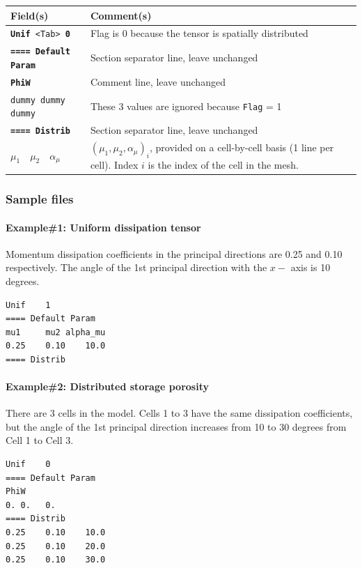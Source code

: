     \begin{tabular}{p{6cm} | p{9cm}}
    \hline
    Field(s) & Comment(s) \\
    \hline  \hline
    \texttt{\textbf{Unif} <Tab> \textbf{0}} & Flag is 0 because the tensor is spatially distributed \\ \hline
    \texttt{\textbf{==== Default Param}} & Section separator line, leave unchanged \\  \hline
    \texttt{\textbf{PhiW}} & Comment line, leave unchanged \\  \hline
    \texttt{dummy  dummy dummy}     & These 3 values are ignored because \texttt{Flag} = 1 \\ \hline
    \texttt{\textbf{==== Distrib}} & Section separator line, leave unchanged \\  \hline
     $\mu_1 \quad \mu_2 \quad \alpha_\mu$      &  $(\mu_1, \mu_2, \alpha_\mu)_i$, provided on a cell-by-cell basis (1 line per cell). Index $i$ is the index of the cell in the mesh.  \\ \hline
    \end{tabular}
%
\subsubsection{Sample files}
%
\paragraph*{Example\#1: Uniform dissipation tensor}
Momentum dissipation coefficients in the principal directions are 0.25 and 0.10 respectively. The angle of the 1st principal direction with the $x-$
axis is 10 degrees.
\begin{verbatim}
Unif	1
==== Default Param
mu1		mu2	alpha_mu
0.25	0.10	10.0
==== Distrib
\end{verbatim}
%
\paragraph*{Example\#2: Distributed storage porosity}
There are 3 cells in the model. Cells 1 to 3 have the same dissipation coefficients, but the angle of the 1st principal direction increases from 10 to 30 degrees from Cell 1 to Cell 3.
\begin{verbatim}
Unif	0
==== Default Param
PhiW
0. 0.	0.
==== Distrib
0.25	0.10	10.0
0.25	0.10	20.0
0.25	0.10	30.0
\end{verbatim}
